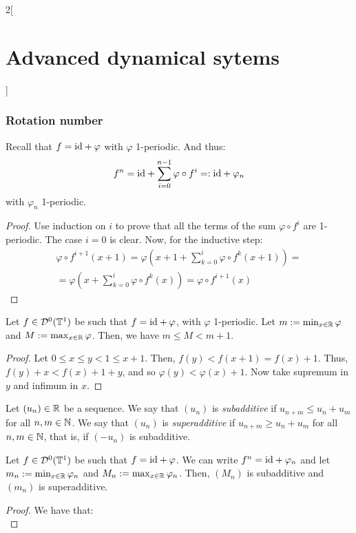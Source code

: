 \documentclass[../../../main_math.tex]{subfiles}
\begin{document}
\begin{multicols}{2}[\section{Advanced dynamical sytems}]
  \subsubsection{Rotation number}\label{ADS:rotation_number_section}
  \begin{lemma}\label{ADS:lema_sum}
    Recall that $f=\mathrm{id}+\varphi$ with $\varphi$ 1-periodic. And thus:
    $$
      f^n=\mathrm{id} + \sum_{i=0}^{n-1} \varphi\circ f^i=: \mathrm{id} + \varphi_n
    $$
    with $\varphi_n$ 1-periodic.
  \end{lemma}
  \begin{proof}
    Use induction on $i$ to prove that all the terms of the sum $\varphi\circ f^i$ are 1-periodic. The case $i=0$ is clear. Now, for the inductive step:
    \begin{multline*}
      \varphi\circ f^{i+1}(x+1)=\varphi\left(x+1+\sum_{k=0}^{i}\varphi\circ f^k(x+1)\right)=\\=\varphi\left( x+\sum_{k=0}^{i}\varphi\circ f^k(x)\right)=\varphi\circ f^{i+1}(x)
    \end{multline*}
  \end{proof}
  \begin{lemma}\label{ADS:lema1}
    Let $f\in \mathcal{D}^0(\mathbb{T}^1)$ be such that $f=\mathrm{id} +\varphi$, with $\varphi$ 1-periodic. Let $m:=\min_{x\in\mathbb{R}}\varphi$ and $M:=\max_{x\in\mathbb{R}}\varphi$. Then, we have $m\leq M< m+1$.
  \end{lemma}
  \begin{proof}
    Let $0\leq x\leq y<1\leq x+1$. Then, $f(y)<f(x+1)=f(x)+1$. Thus, $f(y)+x< f(x)+1+y$, and so $\varphi(y) < \varphi(x)+1$. Now take supremum in $y$ and infimum in $x$.
  \end{proof}
  \begin{definition}
    Let ${(u_n)}\in\mathbb{R}$ be a sequence. We say that $(u_n)$ is \emph{subadditive} if $u_{n+m}\leq u_n+u_m$ for all $n,m\in\mathbb{N}$. We say that $(u_n)$ is \emph{superadditive} if $u_{n+m}\geq u_n+u_m$ for all $n,m\in\mathbb{N}$, that is, if $(-u_n)$ is subadditive.
  \end{definition}
  \begin{lemma}\label{ADS:lema2}
    Let $f\in \mathcal{D}^0(\mathbb{T}^1)$ be such that $f=\mathrm{id} +\varphi$. We can write $f^n=\mathrm{id} +\varphi_n$ and let $m_n:=\min_{x\in\mathbb{R}}\varphi_n$ and $M_n:=\max_{x\in\mathbb{R}}\varphi_n$. Then, $(M_n)$ is subadditive and $(m_n)$ is superadditive.
  \end{lemma}
  \begin{proof}
    We have that:
    \begin{equation*}

\end{equation*}
\end{proof}
\end{multicols}
\end{document}

